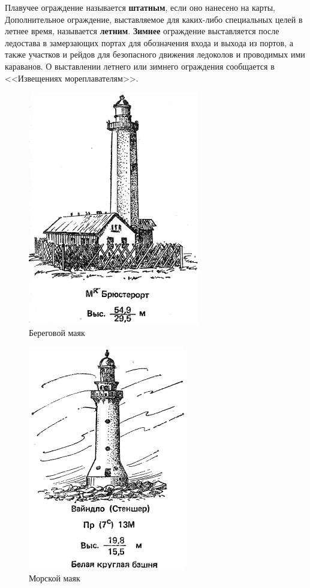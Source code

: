 \documentclass[a4paper, 12pt, twoside, final, book, russian, fittopage, cyremdash]{ncc}
\begin{document}
Плавучее ограждение называется \textbf{штатным}, если оно нанесено на карты, Дополнительное ограждение, выставляемое для каких-либо специальных целей в летнее время, называется \textbf{летним}. \textbf{Зимнее} ограждение выставляется после ледостава в замерзающих портах для обозначения входа и выхода из портов, а также участков и рейдов для безопасного движения ледоколов и проводимых ими караванов. О выставлении летнего или зимнего ограждения сообщается в <<Извещениях мореплавателям>>.

\begin{figure}[htb]
  \centering{}
  \includegraphics[scale=1.2]{0056P}
  \caption{Береговой маяк}
  \label{fig:56}
\end{figure}

\begin{figure}[htb]
  \centering{}
  \includegraphics[scale=1.2]{0057P}
  \caption{Морской маяк}
  \label{fig:57}
\end{figure}
\end{document}
